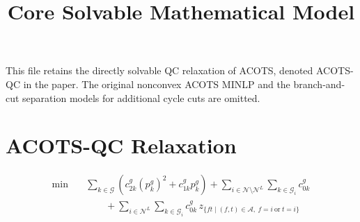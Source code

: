\documentclass{article}
\title{Core Solvable Mathematical Model}
\author{}
\date{}
\begin{document}
\maketitle

This file retains the directly solvable QC relaxation of ACOTS, denoted ACOTS-QC in the paper. The original nonconvex ACOTS MINLP and the branch-and-cut separation models for additional cycle cuts are omitted.

\section{ACOTS-QC Relaxation}

\begin{equation}
\begin{aligned}
\min \quad
& \sum_{k\in\mathcal{G}} \left(c_{2k}^g (p_k^g)^2 + c_{1k}^g p_k^g\right)
+ \sum_{i\in\mathcal{N}\setminus\mathcal{N}^L} \sum_{k\in\mathcal{G}_i} c_{0k}^g \\
& \qquad
+ \sum_{i\in\mathcal{N}^L} \sum_{k\in\mathcal{G}_i} c_{0k}^g\,
z_{\{ft\mid (f,t)\in\mathcal{A},\ f=i\ \text{or}\ t=i\}}
\end{aligned}
\tag{11a}
\end{equation}
\end{document}
